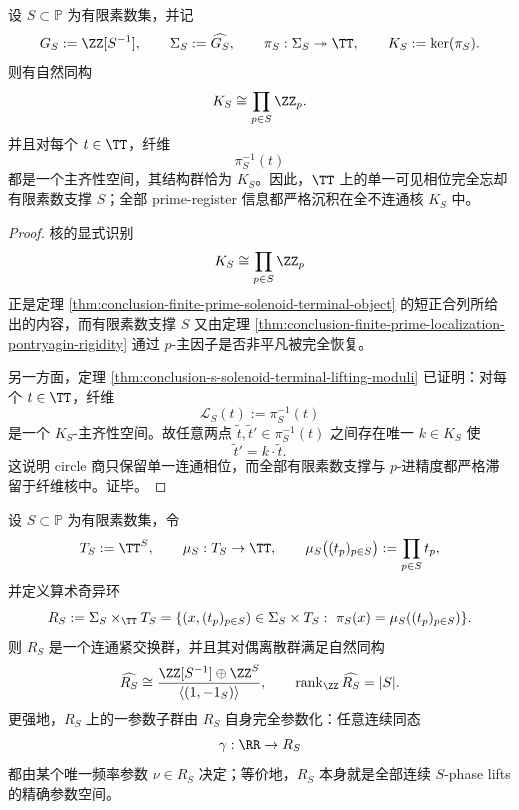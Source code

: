 \begin{theorem}\label{thm:derived-localized-phase-fibers-sadic-torsor-forgetting}
设 \(S\subset \mathbb P\) 为有限素数集，并记
\[
G_S:=\ZZ[S^{-1}],
\qquad
\Sigma_S:=\widehat{G_S},
\qquad
\pi_S:\Sigma_S\twoheadrightarrow \TT,
\qquad
K_S:=\ker(\pi_S).
\]
则有自然同构
\[
K_S\cong \prod_{p\in S}\ZZ_p.
\]
并且对每个 \(t\in \TT\)，纤维
\[
\pi_S^{-1}(t)
\]
都是一个主齐性空间，其结构群恰为 \(K_S\)。因此，\(\TT\) 上的单一可见相位完全忘却有限素数支撑 \(S\)；全部 prime-register 信息都严格沉积在全不连通核 \(K_S\) 中。
\end{theorem}

\begin{proof}
核的显式识别
\[
K_S\cong \prod_{p\in S}\ZZ_p
\]
正是定理 \ref{thm:conclusion-finite-prime-solenoid-terminal-object} 的短正合列所给出的内容，而有限素数支撑 \(S\) 又由定理 \ref{thm:conclusion-finite-prime-localization-pontryagin-rigidity} 通过 \(p\)-主因子是否非平凡被完全恢复。

另一方面，定理 \ref{thm:conclusion-s-solenoid-terminal-lifting-moduli} 已证明：对每个 \(t\in\TT\)，纤维
\[
\mathcal L_S(t):=\pi_S^{-1}(t)
\]
是一个 \(K_S\)-主齐性空间。故任意两点 \(\tilde t,\tilde t'\in \pi_S^{-1}(t)\) 之间存在唯一 \(k\in K_S\) 使
\[
\tilde t'=k\cdot \tilde t.
\]
这说明 circle 商只保留单一连通相位，而全部有限素数支撑与 \(p\)-进精度都严格滞留于纤维核中。证毕。
\end{proof}

\begin{theorem}\label{thm:derived-arithmetic-singular-ring-rank-self-parameterization}
设 \(S\subset\mathbb P\) 为有限素数集，令
\[
T_S:=\TT^S,
\qquad
\mu_S:T_S\to\TT,
\qquad
\mu_S\bigl((t_p)_{p\in S}\bigr):=\prod_{p\in S}t_p,
\]
并定义算术奇异环
\[
R_S:=\Sigma_S\times_{\TT}T_S
=
\{(x,(t_p)_{p\in S})\in \Sigma_S\times T_S:\ \pi_S(x)=\mu_S((t_p)_{p\in S})\}.
\]
则 \(R_S\) 是一个连通紧交换群，并且其对偶离散群满足自然同构
\[
\widehat{R_S}
\cong
\frac{\ZZ[S^{-1}]\oplus \ZZ^S}{\langle(1,-1_S)\rangle},
\qquad
\operatorname{rank}_{\ZZ}\widehat{R_S}=|S|.
\]
更强地，\(R_S\) 上的一参数子群由 \(R_S\) 自身完全参数化：任意连续同态
\[
\gamma:\RR\to R_S
\]
都由某个唯一频率参数 \(\nu\in R_S\) 决定；等价地，\(R_S\) 本身就是全部连续 \(S\)-phase lifts 的精确参数空间。
\end{theorem}


